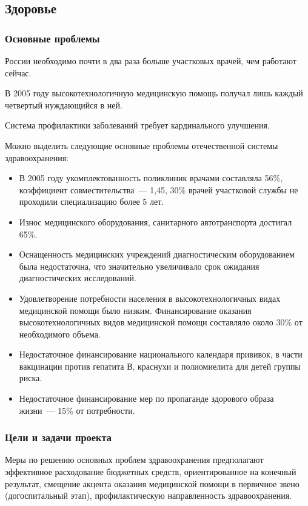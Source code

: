 \documentclass[article, 12pt, russian, oneside]{ncc}
\begin{document}
\subsection{Здоровье}

\subsubsection{Основные проблемы}

России необходимо почти в два раза больше участковых врачей, чем работают сейчас.

В 2005 году высокотехнологичную медицинскую помощь получал лишь каждый четвертый нуждающийся в ней.

Система профилактики заболеваний требует кардинального улучшения.

Можно выделить следующие основные проблемы отечественной системы здравоохранения:

\begin{itemize}
\item В 2005 году укомплектованность поликлиник врачами составляла 56\%, коэффициент совместительства~--- 1,45, 30\% врачей участковой службы не проходили специализацию более 5 лет.
\item Износ медицинского оборудования, санитарного автотранспорта достигал 65\%.
\item Оснащенность медицинских учреждений диагностическим оборудованием была недостаточна, что значительно увеличивало срок ожидания диагностических исследований.
\item Удовлетворение потребности населения в высокотехнологичных видах медицинской помощи было низким. Финансирование оказания высокотехнологичных видов медицинской помощи составляло около 30\% от необходимого объема.
\item Недостаточное финансирование национального календаря прививок, в части вакцинации против гепатита В, краснухи и полиомиелита для детей группы риска.
\item Недостаточное финансирование мер по пропаганде здорового образа жизни~--- 15\% от потребности.
\end{itemize}

\subsubsection{Цели и задачи проекта}

Меры по решению основных проблем здравоохранения предполагают эффективное расходование бюджетных средств, ориентированное на конечный результат, смещение акцента оказания медицинской помощи в первичное звено (догоспитальный этап), профилактическую направленность здравоохранения.
\end{document}

